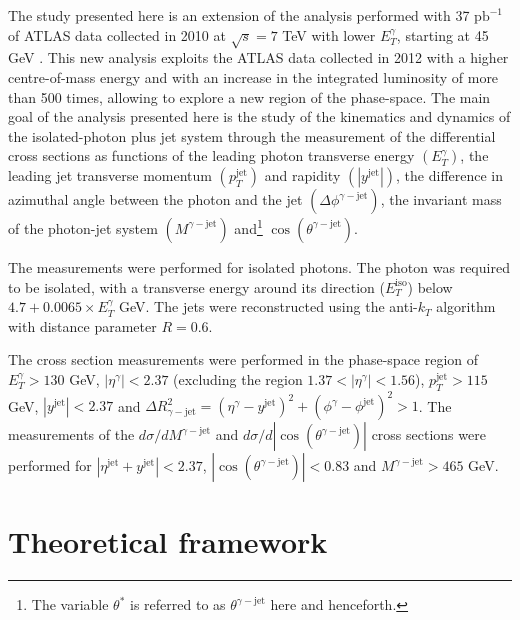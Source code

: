 \documentclass[12pt, twoside]{article}
\numberwithin{equation}{section}
\numberwithin{figure}{section}
\begin{document}
The study presented here is an extension of the analysis performed with 37 $\text{pb}^{-1}$ of ATLAS data collected in 2010 at $\sqrt{s} = 7$ TeV with lower $E^{\gamma}_{T}$, starting at 45 GeV \cite{ATLASpaper, JosuThesis}. This new analysis exploits the ATLAS data collected in 2012 with a higher centre-of-mass energy and with an increase in the integrated luminosity of more than 500 times, allowing to explore a new region of the phase-space. The main goal of the analysis presented here is the study of the kinematics and dynamics of the isolated-photon plus jet system through the measurement of the differential cross sections as functions of the leading photon transverse energy $(E^{\gamma}_{T})$, the leading jet transverse momentum $(p^{\text{jet}}_{T})$ and rapidity $\left( \left|y^{\text{jet}} \right| \right)$, the difference in azimuthal angle between the photon and the jet $(\Delta\phi^{\gamma-\text{jet}})$, the invariant mass of the photon-jet system $(M^{\gamma-\text{jet}})$ and\footnote{ The variable $\theta^{*}$ is referred to as $\theta^{\gamma-\text{jet}}$ here and henceforth.} $\cos(\theta^{\gamma-\text{jet}})$.

The measurements were performed for isolated photons. The photon was required to be isolated, with a transverse energy around its direction ($E^{\text{iso}}_{T}$) below $4.7 + 0.0065 \times E^{\gamma}_{T}$ GeV. The jets were reconstructed using the anti-$k_{T}$ algorithm with distance parameter $R = 0.6$.

The cross section measurements were performed in the phase-space region of $E^{\gamma}_{T} > 130$ GeV, $\left|\eta^{\gamma}\right| < 2.37$ (excluding the region $1.37 < \left|\eta^{\gamma}\right| < 1.56$), $p^{\text{jet}}_{T} > 115$ GeV, $\left|y^{\text{jet}}\right| < 2.37$ and $\Delta R^{2}_{\gamma-\text{jet}} = (\eta^{\gamma} - y^{\text{jet}})^{2} + (\phi^{\gamma} - \phi^{\text{jet}})^{2} > 1$. The measurements of the $d\sigma/dM^{\gamma-\text{jet}}$ and $d\sigma/d\left|\cos(\theta^{\gamma-\text{jet}})\right|$ cross sections were performed for $\left|\eta^{\text{jet}} + y^{\text{jet}}\right| < 2.37$, $\left|\cos(\theta^{\gamma-\text{jet}})\right| < 0.83$ and $M^{\gamma-\text{jet}} > 465$ GeV.

%
%
\newpage
\thispagestyle{empty}
\section{Theoretical framework}
\label{sec:TheoreticalFramework}
\vspace{1.0cm}
\end{document}
